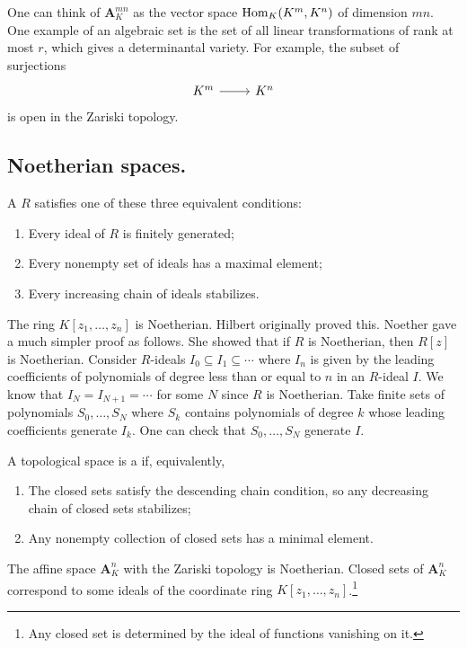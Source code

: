 \documentclass [11 pt, oneside] {article}
\begin{document}
\begin{example}\label{}
One can think of $\mathbf{A}^{mn}_K$ as the vector space $\operatorname{Hom}_K(K^m,K^n)$ of dimension $mn$. One example of an algebraic set is the set of all linear transformations of rank at most $r$, which gives a determinantal variety. For example, the subset of surjections 
\[
\begin{tikzcd}
K^m\ar[r]& K^n
\end{tikzcd}
\]
is open in the Zariski topology.
\end{example}

\subsection{Noetherian spaces.}
\begin{definition}[ ]\label{}
A  $R$ satisfies one of these three equivalent conditions:
\begin{enumerate}
	\item Every ideal of $R$ is finitely generated;
	\item Every nonempty set of ideals has a maximal element;
	\item Every increasing chain of ideals stabilizes. 
\end{enumerate}
\end{definition}

\begin{example}[ ]\label{}
The ring $K[z_1,\hdots,z_n]$ is Noetherian. Hilbert originally proved this. Noether gave a much simpler proof as follows. She showed that if $R$ is Noetherian, then $R[z]$ is Noetherian. Consider $R$-ideals $I_0\subseteq I_1\subseteq\cdots$ where $I_n$ is given by the leading coefficients of polynomials of degree less than or equal to $n$ in an $R$-ideal $I$. We know that $I_N=I_{N+1}=\cdots$ for some $N$ since $R$ is Noetherian. Take finite sets of polynomials $S_0,\hdots, S_N$ where $S_k$ contains polynomials of degree $k$ whose leading coefficients generate $I_k$. One can check that $S_0,\hdots, S_N$ generate $I$. 
\end{example}

\begin{definition}[ ]\label{}
A topological space is a  if, equivalently,
\begin{enumerate}
	\item The closed sets satisfy the descending chain condition, so any decreasing chain of closed sets stabilizes;
	\item Any nonempty collection of closed sets has a minimal element.
\end{enumerate}
\end{definition}
 \begin{remark}
 	The affine space $\mathbf{A}^n_K$ with the Zariski topology is Noetherian. Closed sets of $\mathbf{A}^n_K$ correspond to some ideals of the coordinate ring $K[z_1,\hdots, z_n]$.\footnote{Any closed set is determined by the ideal of functions vanishing on it.}
 \end{remark}
\end{document}
